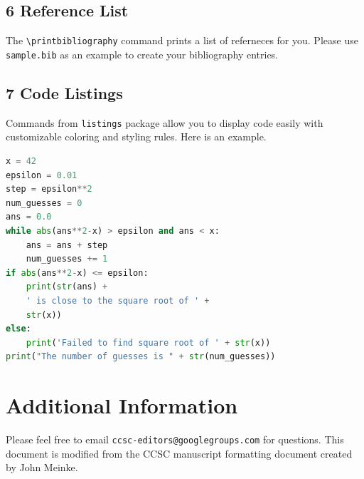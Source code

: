 \documentclass[10pt]{article}
\begin{document}
\subsection*{6 Reference List}
The \verb+\printbibliography+ command prints a list of referneces for you. Please use \texttt{sample.bib} as an example to create your bibliography entries.

\subsection*{7 Code Listings}
Commands from \texttt{listings} package allow you to display code easily with customizable coloring and styling rules. Here is an example.

\begin{lstlisting}[language=Python,  caption=Python example]
x = 42
epsilon = 0.01
step = epsilon**2
num_guesses = 0
ans = 0.0
while abs(ans**2-x) > epsilon and ans < x:
    ans = ans + step
    num_guesses += 1
if abs(ans**2-x) <= epsilon:
    print(str(ans) +
    ' is close to the square root of ' +
    str(x))
else:
    print('Failed to find square root of ' + str(x))
print("The number of guesses is " + str(num_guesses))
\end{lstlisting}

\section*{Additional Information}
Please feel free to email \verb+ccsc-editors@googlegroups.com+ for questions. This document is modified from the CCSC manuscript formatting document\cite{meinke} created by John Meinke.

\medskip

\printbibliography
\end{document}

